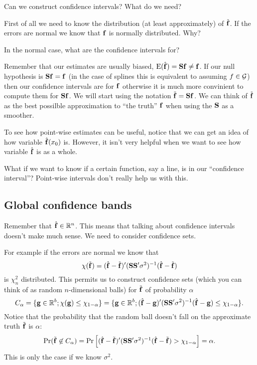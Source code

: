 Can we construct confidence intervals? What do we need?

First of all we need to know the distribution (at least approximately)
of $\hat{{\mathbf f}}$. If the errors are normal we know that $\bf{{\mathbf f}}$ is normally
distributed. Why?

In the normal case, what are the confidence intervals for? 

Remember that our estimates are usually biased, $\mbox{E}(\hat{{\mathbf f}}) = {\mathbf S} {\mathbf f}
\neq {\mathbf f}$. If our null hypothesis is ${\mathbf S} {\mathbf f} = {\mathbf f}$ (in the case of splines
this is equivalent to assuming $f \in \cal G$) then our confidence
intervals are for ${\mathbf f}$ otherwise it is much more convinient to compute
them for ${\mathbf S} {\mathbf f}$. We will start
using the notation $\tilde{{\mathbf f}} = {\mathbf S} {\mathbf f}$. We can think of $\tilde{{\mathbf f}}$
as the best possilble approximation to ``the truth'' ${\mathbf f}$ when using
the ${\mathbf S}$ as a smoother.

To see how point-wise estimates can be useful, notice that we can get
an idea of how variable $\hat{{\mathbf f}}(x_0)$ is. However, it isn't very
helpful when we want to see how variable $\hat{{\mathbf f}}$ is as a whole.

What if we want to know if a certain function, say a line, is
in our ``confidence interval''? Point-wise intervals don't really help
us with this.

\subsection{Global confidence bands}
Remember that $\hat{{\mathbf f}} \in {\mathbb R}^n$. This means that 
talking about confidence intervals doesn't make much sense. We need to
consider confidence sets. 

For example if the errors are normal we know that 
\[
\chi(\tilde{{\mathbf f}}) = (\hat{{\mathbf f}} - \tilde{{\mathbf f}})'({\mathbf S} {\mathbf S}'
\sigma^2)^{-1}(\hat{{\mathbf f}} - \tilde{{\mathbf f}}) 
\]
is $\chi^2_n$ distributed. This permits us to construct confidence
sets (which you can think of as random $n$-dimensional balls) 
for $\tilde{{\mathbf f}}$ of probability $\alpha$
\[
C_{\alpha} = \{ {\mathbf g} \in {\mathbb R}^b ; \chi({\mathbf g}) \leq \chi_{1-\alpha}
\}=\{ {\mathbf g}  \in {\mathbb R}^b; (\hat{{\mathbf f}}
- {\mathbf g})'({\mathbf S} {\mathbf S}' \sigma^2)^{-1}(\hat{{\mathbf f}} - {\mathbf g}) \leq \chi_{1-\alpha} \}.
\]
Notice that the probability that the random ball doesn't fall on the
approximate truth $\tilde{{\mathbf f}}$ is $\alpha$:
\[
\Pr(\tilde{{\mathbf f}} \not\in C_{\alpha}) = \Pr\left[(\hat{{\mathbf f}} - \tilde{{\mathbf f}})'({\mathbf S} {\mathbf S}'
\sigma^2)^{-1}(\hat{{\mathbf f}} - \tilde{{\mathbf f}}) > \chi_{1-\alpha}\right]= \alpha.
\]
This is only the case if we know $\sigma^2$. 

